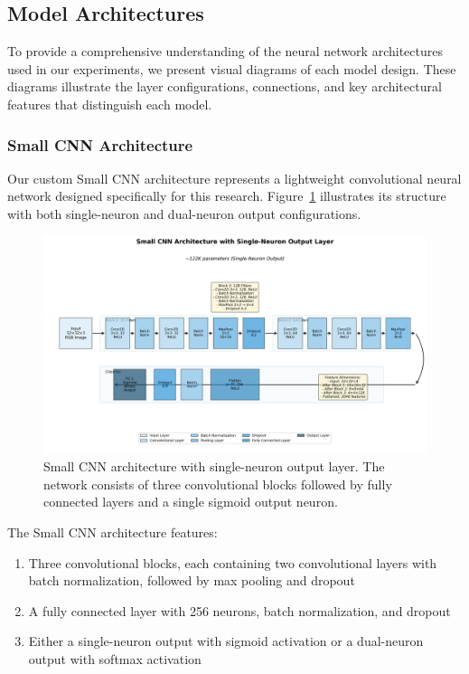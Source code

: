 \subsection{Model Architectures}

To provide a comprehensive understanding of the neural network architectures used in our experiments, we present visual diagrams of each model design. These diagrams illustrate the layer configurations, connections, and key architectural features that distinguish each model.

\subsubsection{Small CNN Architecture}

Our custom Small CNN architecture represents a lightweight convolutional neural network designed specifically for this research. Figure~\ref{fig:small_cnn_arch} illustrates its structure with both single-neuron and dual-neuron output configurations.

\begin{figure}[htbp]
\centering
\includegraphics[width=\textwidth]{figures/small_cnn_1neuron_architecture.png}
\caption{Small CNN architecture with single-neuron output layer. The network consists of three convolutional blocks followed by fully connected layers and a single sigmoid output neuron.}
\label{fig:small_cnn_arch}
\end{figure}

The Small CNN architecture features:
\begin{enumerate}
\item Three convolutional blocks, each containing two convolutional layers with batch normalization, followed by max pooling and dropout
\item A fully connected layer with 256 neurons, batch normalization, and dropout
\item Either a single-neuron output with sigmoid activation or a dual-neuron output with softmax activation
\end{enumerate}

